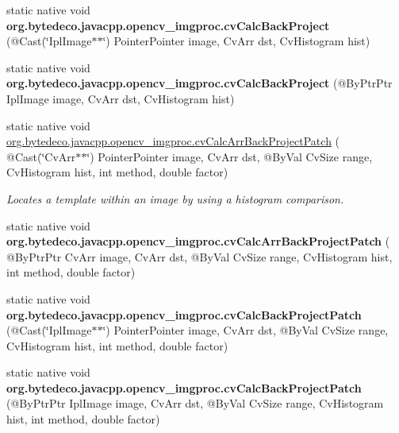 \begin{DoxyCompactItemize}
\mbox{\label{group__imgproc__c_ga49499b0940baaaee15678cbd9f6670c8}} 
static native void {\bfseries org.\+bytedeco.\+javacpp.\+opencv\+\_\+imgproc.\+cv\+Calc\+Back\+Project} (@Cast(\char`\"{}Ipl\+Image$\ast$$\ast$\char`\"{}) Pointer\+Pointer image, Cv\+Arr dst, Cv\+Histogram hist)
\item 
\mbox{\label{group__imgproc__c_ga1f12a1ca4525bb9a42cb2a54890ccce4}} 
static native void {\bfseries org.\+bytedeco.\+javacpp.\+opencv\+\_\+imgproc.\+cv\+Calc\+Back\+Project} (@By\+Ptr\+Ptr Ipl\+Image image, Cv\+Arr dst, Cv\+Histogram hist)
\item 
static native void \hyperlink{group__imgproc__c_ga31746133be041f7be11b46e7df88363e}{org.\+bytedeco.\+javacpp.\+opencv\+\_\+imgproc.\+cv\+Calc\+Arr\+Back\+Project\+Patch} ( @Cast(\char`\"{}Cv\+Arr$\ast$$\ast$\char`\"{}) Pointer\+Pointer image, Cv\+Arr dst, @By\+Val Cv\+Size range, Cv\+Histogram hist, int method, double factor)
\begin{DoxyCompactList}\small\item\em Locates a template within an image by using a histogram comparison. \end{DoxyCompactList}\item 
\mbox{\label{group__imgproc__c_gafc02a003e97f90e3a479f3934a932207}} 
static native void {\bfseries org.\+bytedeco.\+javacpp.\+opencv\+\_\+imgproc.\+cv\+Calc\+Arr\+Back\+Project\+Patch} ( @By\+Ptr\+Ptr Cv\+Arr image, Cv\+Arr dst, @By\+Val Cv\+Size range, Cv\+Histogram hist, int method, double factor)
\item 
\mbox{\label{group__imgproc__c_ga954fc9a45e60f2bedfa7954047b77576}} 
static native void {\bfseries org.\+bytedeco.\+javacpp.\+opencv\+\_\+imgproc.\+cv\+Calc\+Back\+Project\+Patch} (@Cast(\char`\"{}Ipl\+Image$\ast$$\ast$\char`\"{}) Pointer\+Pointer image, Cv\+Arr dst, @By\+Val Cv\+Size range, Cv\+Histogram hist, int method, double factor)
\item 
\mbox{\label{group__imgproc__c_gaa43deb0be8942f8c0659057f42800011}} 
static native void {\bfseries org.\+bytedeco.\+javacpp.\+opencv\+\_\+imgproc.\+cv\+Calc\+Back\+Project\+Patch} (@By\+Ptr\+Ptr Ipl\+Image image, Cv\+Arr dst, @By\+Val Cv\+Size range, Cv\+Histogram hist, int method, double factor)
\item 
$$
\end{DoxyCompactItemize}

